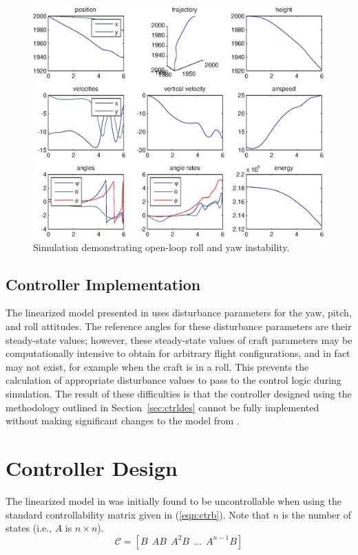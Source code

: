 \documentclass{sydeStyle}
\begin{document}
\begin{figure}
    \begin{center}
        \includegraphics[width=0.8\columnwidth]{figs/rollunstable}
    \end{center}
    \caption{Simulation demonstrating open-loop roll and yaw instability.}
    \label{fig:rollinstability}
\end{figure}

\subsection{Controller Implementation}
\label{sec:ctrlimpl}
The linearized model presented in \cite{spottiswoode} uses disturbance
parameters for the yaw, pitch, and roll attitudes.  The reference angles for
these disturbance parameters are their steady-state values; however, these
steady-state values of craft parameters may be computationally
intensive to obtain for arbitrary flight configurations, and in fact may not
exist, for example when the craft is in a roll.
This prevents the calculation of appropriate disturbance values to
pass to the control logic during simulation.  The result of these difficulties
is that the controller designed using the methodology outlined in
Section~\ref{sec:ctrldes} cannot be fully implemented without making significant
changes to the model from \cite{spottiswoode}.

\section{Controller Design}
The linearized model in \cite{spottiswoode} was initially found to be
uncontrollable when using the standard controllability matrix given in
(\ref{eqn:ctrb}).  Note that $n$ is the number of states (i.e., $A$ is $n \times
n$).
\begin{equation}
    \mathcal{C} = [B \;\, AB \;\, A^2B \;\, \ldots \;\, A^{n-1}B]
    \label{eqn:ctrb}
\end{equation}
\end{document}

